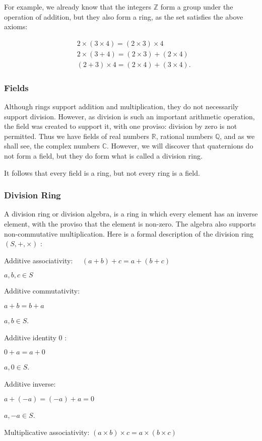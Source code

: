 For example, we already know that the integers $\mathbb{Z}$ form a group under the operation of addition, but they also form a ring, as the set satisfies the above axioms:

$$
\begin{aligned}
& 2 \times(3 \times 4)=(2 \times 3) \times 4 \\
& 2 \times(3+4)=(2 \times 3)+(2 \times 4) \\
& (2+3) \times 4=(2 \times 4)+(3 \times 4) .
\end{aligned}
$$

\subsubsection{Fields}
Although rings support addition and multiplication, they do not necessarily support division. However, as division is such an important arithmetic operation, the field was created to support it, with one proviso: division by zero is not permitted. Thus we have fields of real numbers $\mathbb{R}$, rational numbers $\mathbb{Q}$, and as we shall see, the complex numbers $\mathbb{C}$. However, we will discover that quaternions do not form a field, but they do form what is called a division ring.

It follows that every field is a ring, but not every ring is a field.

\subsubsection{Division Ring}
A division ring or division algebra, is a ring in which every element has an inverse element, with the proviso that the element is non-zero. The algebra also supports non-commutative multiplication. Here is a formal description of the division ring $(S,+, \times)$ :

Additive associativity: $\quad(a+b)+c=a+(b+c)$

$a, b, c \in S$

Additive commutativity:

$a+b=b+a$

$a, b \in S$.

Additive identity 0 :

$0+a=a+0$

$a, 0 \in S$.

Additive inverse:

$a+(-a)=(-a)+a=0$

$a,-a \in S$.

Multiplicative associativity: $(a \times b) \times c=a \times(b \times c)$

